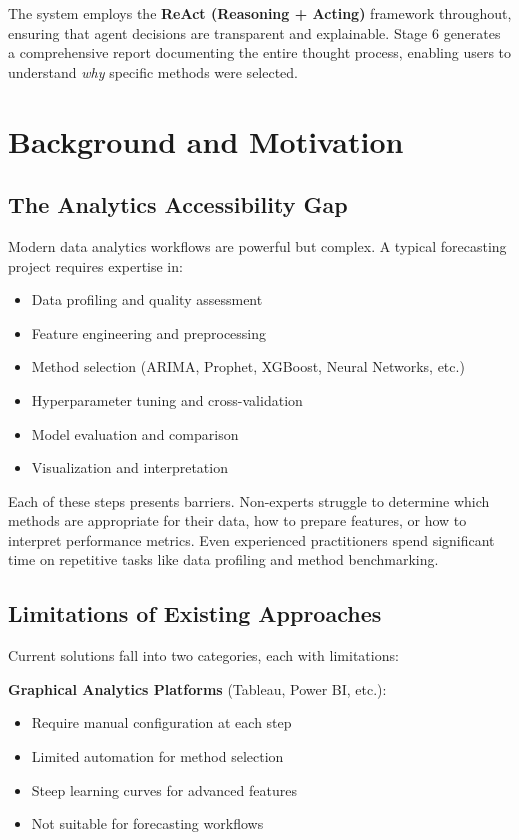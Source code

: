 \documentclass[11pt,a4paper]{article}
\begin{document}
The system employs the \textbf{ReAct (Reasoning + Acting)} framework throughout, ensuring that agent decisions are transparent and explainable. Stage 6 generates a comprehensive report documenting the entire thought process, enabling users to understand \textit{why} specific methods were selected.

\section{Background and Motivation}

\subsection{The Analytics Accessibility Gap}

Modern data analytics workflows are powerful but complex. A typical forecasting project requires expertise in:

\begin{itemize}
    \item Data profiling and quality assessment
    \item Feature engineering and preprocessing
    \item Method selection (ARIMA, Prophet, XGBoost, Neural Networks, etc.)
    \item Hyperparameter tuning and cross-validation
    \item Model evaluation and comparison
    \item Visualization and interpretation
\end{itemize}

Each of these steps presents barriers. Non-experts struggle to determine which methods are appropriate for their data, how to prepare features, or how to interpret performance metrics. Even experienced practitioners spend significant time on repetitive tasks like data profiling and method benchmarking.

\subsection{Limitations of Existing Approaches}

Current solutions fall into two categories, each with limitations:

\textbf{Graphical Analytics Platforms} (Tableau, Power BI, etc.):
\begin{itemize}
    \item Require manual configuration at each step
    \item Limited automation for method selection
    \item Steep learning curves for advanced features
    \item Not suitable for forecasting workflows
\end{itemize}
\end{document}
